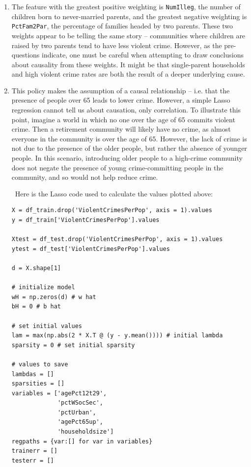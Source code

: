 \documentclass{article}
\begin{document}
\begin{enumerate}
        \item The feature with the greatest positive weighting is \texttt{NumIlleg}, the number of children born to never-married parents, and the greatest negative weighting is \texttt{PctFam2Par}, the percentage of families headed by two parents.
        These two weights appear to be telling the same story -- communities where children are raised by two parents tend to have less violent crime.
        However, as the pre-questions indicate, one must be careful when attempting to draw conclusions about causality from these weights.
        It might be that single-parent households and high violent crime rates are both the result of a deeper underlying cause.

        \item This policy makes the assumption of a causal relationship -- i.e. that the presence of people over 65 leads to lower crime.
        However, a simple Lasso regression cannot tell us about causation, only correlation.
        To illustrate this point, imagine a world in which no one over the age of 65 commits violent crime.
        Then a retirement community will likely have no crime, as almost everyone in the community is over the age of 65.
        However, the lack of crime is not due to the presence of the older people, but rather the absence of younger people.
        In this scenario, introducing older people to a high-crime community does not negate the presence of young crime-committing people in the community, and so would not help reduce crime.

        \, \newline
        Here is the Lasso code used to calculate the values plotted above:
        \begin{verbatim}
X = df_train.drop('ViolentCrimesPerPop', axis = 1).values
y = df_train['ViolentCrimesPerPop'].values

Xtest = df_test.drop('ViolentCrimesPerPop', axis = 1).values
ytest = df_test['ViolentCrimesPerPop'].values

d = X.shape[1]

# initialize model
wH = np.zeros(d) # w hat
bH = 0 # b hat

# set initial values
lam = max(np.abs(2 * X.T @ (y - y.mean()))) # initial lambda
sparsity = 0 # set initial sparsity

# values to save
lambdas = []
sparsities = []
variables = ['agePct12t29',
             'pctWSocSec',
             'pctUrban',
             'agePct65up',
             'householdsize']
regpaths = {var:[] for var in variables}
trainerr = []
testerr = []


\end{verbatim}
\end{enumerate}
\end{document}
